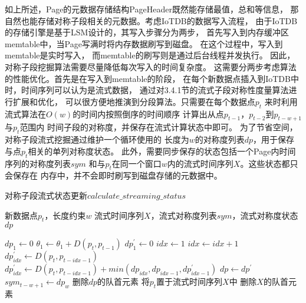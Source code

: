 如上所述，Page的元数据存储结构PageHeader既然能存储最值，总和等信息，
那自然也能存储对称子段相关的元数据。考虑IoTDB的数据写入流程，
由于IoTDB的存储引擎是基于LSM\cite{DBLP:journals/vldb/LuoC20}设计的，其写入步骤分为两步，
首先写入到内存缓冲区memtable中，当Page写满时将内存数据刷写到磁盘。
在这个过程中，写入到memtable是实时写入，
而memtable的刷写则是通过后台线程并发执行。
因此，对称子段挖掘算法需要尽量降低每次写入的时间复杂度。
这需要分两步考虑算法的性能优化。首先是在写入到memtable的阶段，
在每个新数据点插入到IoTDB中时，时间序列可以认为是流式数据，
通过对3.4.1节的流式子段对称性度量算法进行扩展和优化，
可以很方便地推演到分段算法。只需要在每个数据点$p_t$
来时利用流式算法在$O(w)$的时间内按照倒序的时间顺序
计算出从点$p_{t-1}$，$p_{t-2}$到$p_{t-w+1}$与$p_t$范围内
时间子段的对称度，并保存在流式计算状态中即可。
为了节省空间，对称子段流式挖掘通过维护一个循环使用的
长度为$w$的对称度列表$dp$，用于保存与点$p_t$相关的单列对称度状态。
此外，需要同步保存的状态包括一个Page内时间序列的对称度列表$sym$
和与$p_t$在同一个窗口$w$内的流式时间序列$X$。这些状态都只会保存在
内存中，并不会即时刷写到磁盘存储的元数据中。

\renewcommand{\algorithmicrequire}{\textbf{输入：}\unskip}
\renewcommand{\algorithmicensure}{\textbf{输出：}\unskip}

\begin{algorithm}
  \caption{对称子段流式状态更新$calculate\_streaming\_status$}
  \label{alg:iotdb_streaming}
  \small
  \begin{algorithmic}
    \REQUIRE 新数据点$p_t$，长度约束$w$
    \ENSURE 流式时间序列$X$，流式对称度列表$sym$，流式对称度状态$dp$

        \STATE $dp_{1} \leftarrow 0$
    \ELSE
      \STATE $\theta_1 \leftarrow \theta_1 + D\left(p_{t}, p_{t-1}\right)$
      \STATE $dp_1^{\prime} \leftarrow 0$
      \STATE $ idx \leftarrow 1$
        \STATE $ idx \leftarrow idx+1$
          \STATE $dp_{idx}^{\prime} \leftarrow D\left(p_{t}, p_{t-idx-1}\right)$
        \ELSE
          \STATE $dp_{idx}^{\prime} \leftarrow D\left(p_{t}, p_{t-idx-1}\right)+min(dp_{idx},dp_{idx-1},dp_{idx-1}^{\prime})$
        \ENDIF
      \ENDWHILE
      \STATE $ dp \leftarrow dp^{\prime}$
        \STATE $sym_{t-w+1} \leftarrow dp_{w}$
        \STATE 删除$dp$的队首元素
      \ENDIF
    \ENDIF
    \STATE 将$p_t$置于流式时间序列$X$中
      \STATE 删除$X$的队首元素
    \ENDIF
  \end{algorithmic}
\end{algorithm}


